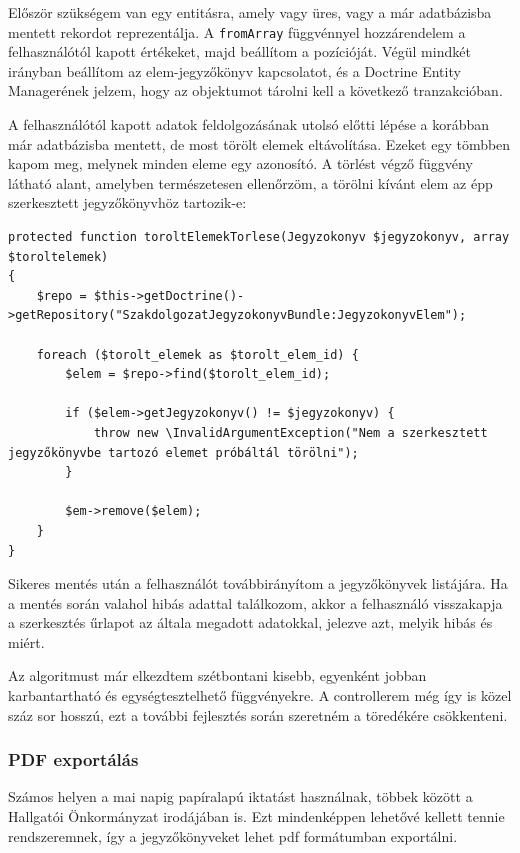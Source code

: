 \documentclass[a4paper,12pt,oneside]{report}
\begin{document}
Először szükségem van egy entitásra, amely vagy üres, vagy a már adatbázisba mentett rekordot reprezentálja. A {\tt fromArray} függvénnyel hozzárendelem a felhasználótól kapott értékeket, majd beállítom a pozícióját. Végül mindkét irányban beállítom az elem-jegyzőkönyv kapcsolatot, és a Doctrine Entity Managerének jelzem, hogy az objektumot tárolni kell a következő tranzakcióban.

A felhasználótól kapott adatok feldolgozásának utolsó előtti lépése a korábban már adatbázisba mentett, de most törölt elemek eltávolítása. Ezeket egy tömbben kapom meg, melynek minden eleme egy azonosító. A törlést végző függvény látható alant, amelyben természetesen ellenőrzöm, a törölni kívánt elem az épp szerkesztett jegyzőkönyvhöz tartozik-e:

\begin{lstlisting}
protected function toroltElemekTorlese(Jegyzokonyv $jegyzokonyv, array $toroltelemek)
{
    $repo = $this->getDoctrine()->getRepository("SzakdolgozatJegyzokonyvBundle:JegyzokonyvElem");

    foreach ($torolt_elemek as $torolt_elem_id) {
        $elem = $repo->find($torolt_elem_id);

        if ($elem->getJegyzokonyv() != $jegyzokonyv) {
            throw new \InvalidArgumentException("Nem a szerkesztett jegyzőkönyvbe tartozó elemet próbáltál törölni");
        }

        $em->remove($elem);
    }
}
\end{lstlisting}

Sikeres mentés után a felhasználót továbbirányítom a jegyzőkönyvek listájára. Ha a mentés során valahol hibás adattal találkozom, akkor a felhasználó visszakapja a szerkesztés űrlapot az általa megadott adatokkal, jelezve azt, melyik hibás és miért.

Az algoritmust már elkezdtem szétbontani kisebb, egyenként jobban karbantartható és egységtesztelhető függvényekre. A controllerem még így is közel száz sor hosszú, ezt a további fejlesztés során szeretném a töredékére csökkenteni.

\subsubsection*{PDF exportálás}

Számos helyen a mai napig papíralapú iktatást használnak, többek között a Hallgatói Önkormányzat irodájában is. Ezt mindenképpen lehetővé kellett tennie rendszeremnek, így a jegyzőkönyveket lehet pdf formátumban exportálni.
\end{document}
